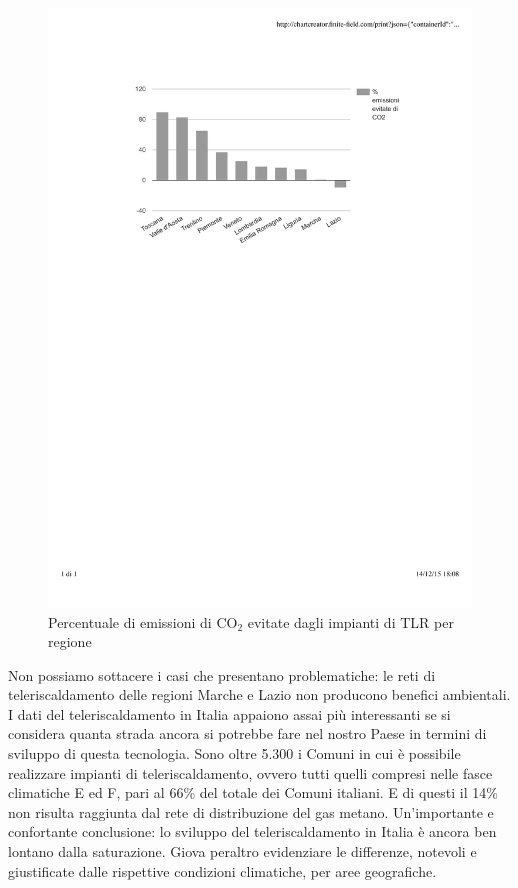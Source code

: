 \documentclass[laurea,oneside,11pt]{USiena_tesiLM}
\begin{document}
\begin{figure}[!ht]
\centering
\includegraphics[width=\textwidth]{figure/CO2} 
\caption{Percentuale di emissioni di CO$_2$ evitate dagli impianti di TLR per regione}
\label{fig:CO2}
\end{figure}

Non possiamo sottacere i casi che presentano problematiche: le reti di teleriscaldamento delle regioni Marche e Lazio non producono benefici ambientali.\\

I dati del teleriscaldamento in Italia appaiono assai più interessanti se si considera quanta strada ancora si potrebbe fare nel nostro Paese in termini di sviluppo di questa tecnologia. Sono oltre 5.300 i Comuni in cui è possibile realizzare impianti di teleriscaldamento, ovvero tutti quelli compresi nelle fasce climatiche E ed F, pari al 66\% del totale dei Comuni italiani. E di questi il 14\% non risulta raggiunta dal rete di distribuzione del gas metano. 
Un'importante e confortante conclusione: lo sviluppo del teleriscaldamento in Italia è ancora ben lontano dalla saturazione.
Giova peraltro evidenziare le differenze, notevoli e giustificate dalle rispettive condizioni climatiche, per aree geografiche.\\
\end{document}

